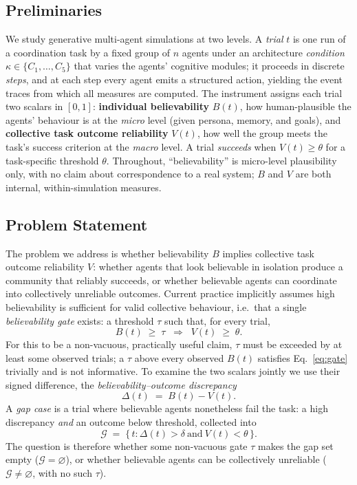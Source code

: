 \documentclass[runningheads]{llncs}
\begin{document}
\subsection{Preliminaries}\label{sec:prelim}
We study generative multi-agent simulations at two levels. A \emph{trial} $t$ is one run of a
coordination task by a fixed group of $n$ agents under an architecture \emph{condition}
$\kappa\in\{C_1,\dots,C_5\}$ that varies the agents' cognitive modules; it proceeds in discrete
\emph{steps}, and at each step every agent emits a structured action, yielding the event traces
from which all measures are computed. The instrument assigns each trial two scalars in $[0,1]$:
\textbf{individual believability} $B(t)$, how human-plausible the agents' behaviour is at the
\emph{micro} level (given persona, memory, and goals), and \textbf{collective task outcome
reliability} $V(t)$, how well the group meets the task's success criterion at the \emph{macro}
level. A trial \emph{succeeds} when $V(t)\geq\theta$ for a task-specific threshold $\theta$.
Throughout, ``believability'' is micro-level plausibility only, with no claim about
correspondence to a real system; $B$ and $V$ are both internal, within-simulation measures.

\subsection{Problem Statement}\label{sec:problem}
The problem we address is whether believability $B$ implies collective task outcome reliability
$V$: whether agents that look believable in isolation produce a community that reliably succeeds,
or whether believable agents can coordinate into collectively unreliable outcomes. Current practice
implicitly assumes high believability is sufficient for valid collective behaviour, i.e.\ that a
single \emph{believability gate} exists: a threshold $\tau$ such that, for every trial,
\begin{equation}\label{eq:gate}
B(t)\;\geq\;\tau \;\;\Longrightarrow\;\; V(t)\;\geq\;\theta .
\end{equation}
For this to be a non-vacuous, practically useful claim, $\tau$ must be exceeded by at least some
observed trials; a $\tau$ above every observed $B(t)$ satisfies Eq.~\eqref{eq:gate} trivially and
is not informative. To examine the two scalars jointly we use their signed difference, the
\emph{believability--outcome discrepancy}
\begin{equation}\label{eq:discrepancy}
\Delta(t)\;=\;B(t)-V(t).
\end{equation}
A \emph{gap case} is a trial where believable agents nonetheless fail the task: a high discrepancy
\emph{and} an outcome below threshold, collected into
\begin{equation}\label{eq:gapset}
\mathcal{G}\;=\;\{\, t : \Delta(t) > \delta \ \text{and} \ V(t) < \theta \,\}.
\end{equation}
The question is therefore whether some non-vacuous gate $\tau$ makes the gap set empty
($\mathcal{G}=\varnothing$), or whether believable agents can be collectively unreliable
($\mathcal{G}\neq\varnothing$, with no such $\tau$).
\end{document}
